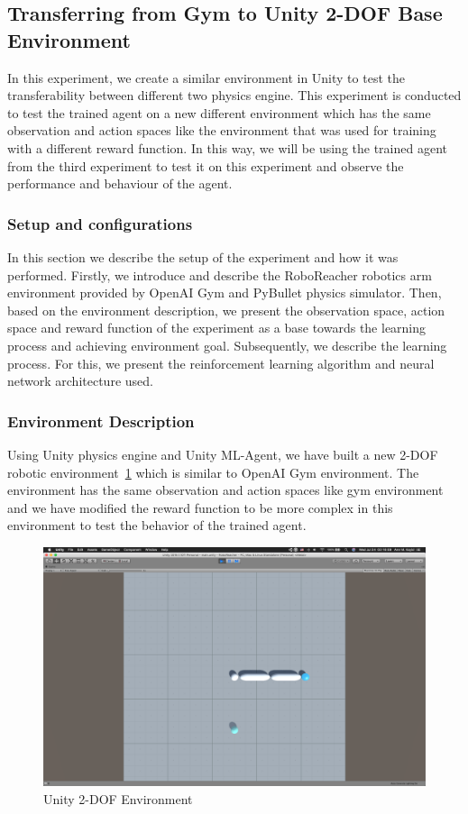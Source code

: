 
\subsection{Transferring from Gym to Unity 2-DOF Base Environment}

In this experiment, we create a similar environment in Unity to test the transferability between different two physics engine. This experiment is conducted to test the trained agent on a new different environment which has the same observation and action spaces like the environment that was used for training with a different reward function. In this way, we will be using the trained agent from the third experiment to test it on this experiment and observe the performance and behaviour of the agent.

\subsubsection{Setup and configurations}

In this section we describe the setup of the experiment and how it was performed. Firstly, we introduce and describe the RoboReacher robotics arm environment provided by OpenAI Gym and PyBullet physics simulator. Then, based on the environment description, we present the observation space, action space and reward function of the experiment as a base towards the learning process and achieving environment goal. Subsequently, we describe the learning process. For this, we present the reinforcement learning algorithm and neural network architecture used.


\subsubsection{Environment Description}
Using Unity physics engine and Unity ML-Agent, we have built a new 2-DOF robotic environment~\ref{fig:unity_reacher} which is similar to OpenAI Gym environment. The environment has the same observation and action spaces like gym environment and we have modified the reward function to be more complex in this environment to test the behavior of the trained agent.

\begin{figure}[!htb]
		\centering
				\includegraphics[width=0.7\linewidth]{figures/envs/unity_roboreacher.png}
				\caption{Unity 2-DOF Environment}
				\label{fig:unity_reacher}
\end{figure}

